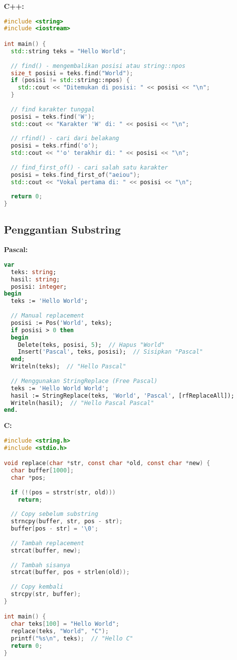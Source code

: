 \documentclass[../main.tex]{subfiles}
\begin{document}
\textbf{C++:}
\begin{lstlisting}[language=C++, caption={Pencarian di C++}]
#include <string>
#include <iostream>

int main() {
  std::string teks = "Hello World";
  
  // find() - mengembalikan posisi atau string::npos
  size_t posisi = teks.find("World");
  if (posisi != std::string::npos) {
    std::cout << "Ditemukan di posisi: " << posisi << "\n";
  }
  
  // find karakter tunggal
  posisi = teks.find('W');
  std::cout << "Karakter 'W' di: " << posisi << "\n";
  
  // rfind() - cari dari belakang
  posisi = teks.rfind('o');
  std::cout << "'o' terakhir di: " << posisi << "\n";
  
  // find_first_of() - cari salah satu karakter
  posisi = teks.find_first_of("aeiou");
  std::cout << "Vokal pertama di: " << posisi << "\n";
  
  return 0;
}
\end{lstlisting}

\subsection{Penggantian Substring}

\textbf{Pascal:}
\begin{lstlisting}[language=Pascal, caption={Replace di Pascal}]
var
  teks: string;
  hasil: string;
  posisi: integer;
begin
  teks := 'Hello World';
  
  // Manual replacement
  posisi := Pos('World', teks);
  if posisi > 0 then
  begin
    Delete(teks, posisi, 5);  // Hapus "World"
    Insert('Pascal', teks, posisi);  // Sisipkan "Pascal"
  end;
  Writeln(teks);  // "Hello Pascal"
  
  // Menggunakan StringReplace (Free Pascal)
  teks := 'Hello World World';
  hasil := StringReplace(teks, 'World', 'Pascal', [rfReplaceAll]);
  Writeln(hasil);  // "Hello Pascal Pascal"
end.
\end{lstlisting}

\textbf{C:}
\begin{lstlisting}[language=C, caption={Replace di C (manual)}]
#include <string.h>
#include <stdio.h>

void replace(char *str, const char *old, const char *new) {
  char buffer[1000];
  char *pos;
  
  if (!(pos = strstr(str, old)))
    return;
  
  // Copy sebelum substring
  strncpy(buffer, str, pos - str);
  buffer[pos - str] = '\0';
  
  // Tambah replacement
  strcat(buffer, new);
  
  // Tambah sisanya
  strcat(buffer, pos + strlen(old));
  
  // Copy kembali
  strcpy(str, buffer);
}

int main() {
  char teks[100] = "Hello World";
  replace(teks, "World", "C");
  printf("%s\n", teks);  // "Hello C"
  return 0;
}
\end{lstlisting}
\end{document}
